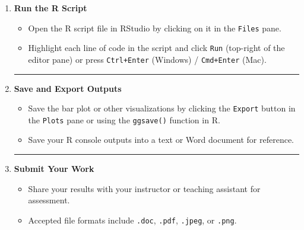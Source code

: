 \documentclass[oneside,openany]{book}
\begin{document}
\begin{enumerate}
    \begin{center}\rule{0.5\linewidth}{0.5pt}\end{center}

    \item \textbf{Run the R Script}
    
    \begin{itemize}
        \item Open the R script file in RStudio by clicking on it in the \texttt{Files} pane.
        \item Highlight each line of code in the script and click \texttt{Run} (top-right of the editor pane) or press \texttt{Ctrl+Enter} (Windows) / \texttt{Cmd+Enter} (Mac).
    \end{itemize}
    
    \begin{center}\rule{0.5\linewidth}{0.5pt}\end{center}

    \item \textbf{Save and Export Outputs}
    
    \begin{itemize}
        \item Save the bar plot or other visualizations by clicking the \texttt{Export} button in the \texttt{Plots} pane or using the \texttt{ggsave()} function in R.
        \item Save your R console outputs into a text or Word document for reference.
    \end{itemize}
    
    \begin{center}\rule{0.5\linewidth}{0.5pt}\end{center}

    \item \textbf{Submit Your Work}
    
    \begin{itemize}
        \item Share your results with your instructor or teaching assistant for assessment.
        \item Accepted file formats include \texttt{.doc}, \texttt{.pdf}, \texttt{.jpeg}, or \texttt{.png}.
    \end{itemize}
\end{enumerate}
\end{document}
